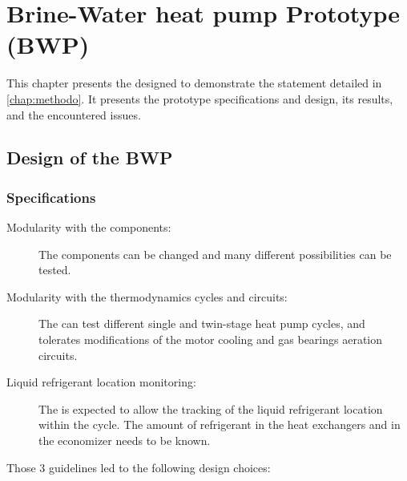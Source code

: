 \chapter{Brine-Water heat pump Prototype (BWP)}
\label{chap:bwp}
\resetallacronyms

\begin{shaded}
  This chapter presents the \BWP{} designed to demonstrate the
  statement detailed in \cref{chap:methodo}. It presents the prototype
  specifications and design, its results, and the encountered issues.
\end{shaded}

\section{Design of the BWP}
\label{sec:bwp-design}

\subsection{Specifications}
\label{sec:bwp-specs}

\begin{description}
\item[Modularity with the components:] The \BWP{} components can be
  changed and many different possibilities can be tested.
\item[Modularity with the thermodynamics cycles and circuits:] The
  \BWP{} can test different single and twin-stage heat pump cycles,
  and tolerates modifications of the motor cooling and gas bearings
  aeration circuits.
\item[Liquid refrigerant location monitoring:] The \BWP{} is expected
  to allow the tracking of the liquid refrigerant location within the
  cycle. The amount of refrigerant in the heat exchangers and in the
  economizer needs to be known.
\end{description}

Those 3 guidelines led to the following design choices:

